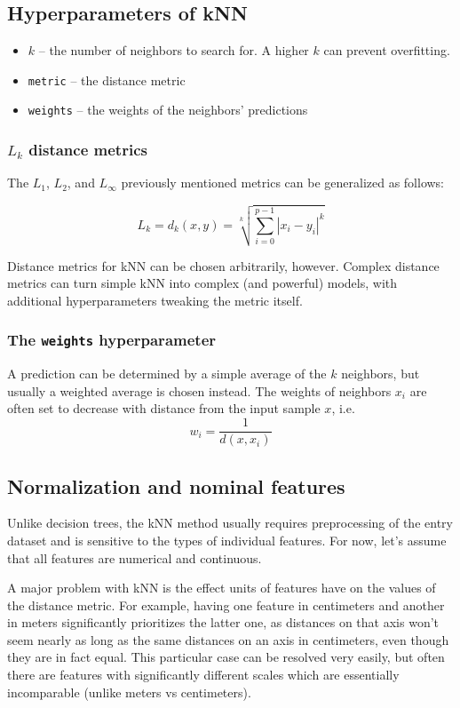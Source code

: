 \documentclass[a4paper]{article}
\begin{document}
	\subsection{Hyperparameters of kNN}
	\begin{itemize}
		\item $k$ -- the number of neighbors to search for.
			A higher $k$ can prevent overfitting.
		\item \texttt{metric} -- the distance metric
		\item \texttt{weights} -- the weights of the neighbors' predictions
	\end{itemize}

	\subsubsection{$L_k$ distance metrics}
	The $L_1$, $L_2$, and $L_\infty$ previously mentioned metrics can be
	generalized as follows:

	$$L_k = d_k(x, y) = \sqrt[k]{\sum_{i = 0}^{p - 1} |x_i - y_i|^k} $$

	Distance metrics for kNN can be chosen arbitrarily, however. Complex distance
	metrics can turn simple kNN into complex (and powerful) models, with additional
	hyperparameters tweaking the metric itself.

	\subsubsection{The \texttt{weights} hyperparameter}
	A prediction can be determined by a simple average of the $k$ neighbors,
	but usually a weighted average is chosen instead. The weights of neighbors
	$x_i$ are often	set to decrease with distance from the input sample $x$, i.e.
	$$w_i = \frac{1}{d(x, x_i)}$$

	\subsection{Normalization and nominal features}
	Unlike decision trees, the kNN method usually requires preprocessing of the entry dataset
	and is sensitive to the types of individual features. For now, let's assume that all features
	are numerical and continuous.

	A major problem with kNN is the effect units of features have on the values of the
	distance metric. For example, having one feature in centimeters and another in meters
	significantly prioritizes the latter one, as distances on that axis won't seem nearly
	as long as the same distances on an axis in centimeters, even though they are
	in fact equal. This particular case can be resolved very easily, but often there
	are features with significantly different scales which are essentially incomparable
	(unlike meters vs centimeters).
\end{document}
